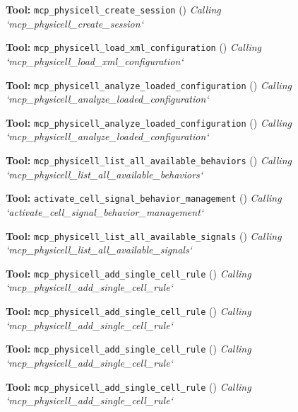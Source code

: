 \documentclass[11pt,a4paper]{article}
\begin{document}
\begin{toolokbox}
\textbf{Tool:} \texttt{mcp\_physicell\_create\_session} (\checkmark)
\textit{Calling `mcp\_physicell\_create\_session`}
\end{toolokbox}
\begin{toolokbox}
\textbf{Tool:} \texttt{mcp\_physicell\_load\_xml\_configuration} (\checkmark)
\textit{Calling `mcp\_physicell\_load\_xml\_configuration`}
\end{toolokbox}
\begin{toolokbox}
\textbf{Tool:} \texttt{mcp\_physicell\_analyze\_loaded\_configuration} (\checkmark)
\textit{Calling `mcp\_physicell\_analyze\_loaded\_configuration`}
\end{toolokbox}
\begin{toolokbox}
\textbf{Tool:} \texttt{mcp\_physicell\_analyze\_loaded\_configuration} (\checkmark)
\textit{Calling `mcp\_physicell\_analyze\_loaded\_configuration`}
\end{toolokbox}
\begin{toolokbox}
\textbf{Tool:} \texttt{mcp\_physicell\_list\_all\_available\_behaviors} (\checkmark)
\textit{Calling `mcp\_physicell\_list\_all\_available\_behaviors`}
\end{toolokbox}
\begin{toolokbox}
\textbf{Tool:} \texttt{activate\_cell\_signal\_behavior\_management} (\checkmark)
\textit{Calling `activate\_cell\_signal\_behavior\_management`}
\end{toolokbox}
\begin{toolokbox}
\textbf{Tool:} \texttt{mcp\_physicell\_list\_all\_available\_signals} (\checkmark)
\textit{Calling `mcp\_physicell\_list\_all\_available\_signals`}
\end{toolokbox}
\begin{toolokbox}
\textbf{Tool:} \texttt{mcp\_physicell\_add\_single\_cell\_rule} (\checkmark)
\textit{Calling `mcp\_physicell\_add\_single\_cell\_rule`}
\end{toolokbox}
\begin{toolokbox}
\textbf{Tool:} \texttt{mcp\_physicell\_add\_single\_cell\_rule} (\checkmark)
\textit{Calling `mcp\_physicell\_add\_single\_cell\_rule`}
\end{toolokbox}
\begin{toolokbox}
\textbf{Tool:} \texttt{mcp\_physicell\_add\_single\_cell\_rule} (\checkmark)
\textit{Calling `mcp\_physicell\_add\_single\_cell\_rule`}
\end{toolokbox}
\begin{toolokbox}
\textbf{Tool:} \texttt{mcp\_physicell\_add\_single\_cell\_rule} (\checkmark)
\textit{Calling `mcp\_physicell\_add\_single\_cell\_rule`}
\end{toolokbox}
\end{document}
